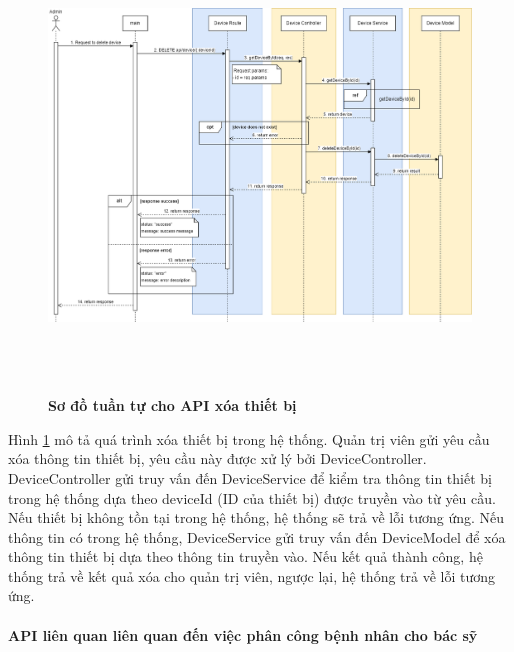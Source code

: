  \begin{figure}[H]
  \centering
  \includegraphics[width=16cm,height=12cm]{Images/sequence_api/deleteDeviceById.png}
  \caption[Sơ đồ tuần tự cho API xóa thiết bị]{\bfseries \fontsize{12pt}{0pt}
  \selectfont Sơ đồ tuần tự cho API xóa thiết bị }
  \label{api_deleteDeviceById} %
\end{figure}
Hình \ref{api_deleteDeviceById} mô tả quá trình xóa thiết bị trong hệ thống. Quản trị viên gửi yêu cầu xóa thông tin thiết bị, 
yêu cầu này được xử lý bởi DeviceController. DeviceController gửi truy vấn đến DeviceService để kiểm tra thông tin thiết bị trong hệ thống dựa theo deviceId (ID của thiết bị) được truyền vào từ yêu cầu. 
Nếu thiết bị không tồn tại trong hệ thống, hệ thống sẽ trả về lỗi tương ứng. Nếu thông tin có trong hệ thống, DeviceService gửi truy vấn đến DeviceModel để xóa thông tin thiết bị 
dựa theo thông tin truyền vào. Nếu kết quả thành công, hệ thống trả về kết quả xóa cho quản trị viên, ngược lại, hệ thống trả về lỗi tương ứng.



\paragraph{API liên quan liên quan đến việc phân công bệnh nhân cho bác sỹ}
\mbox{}


